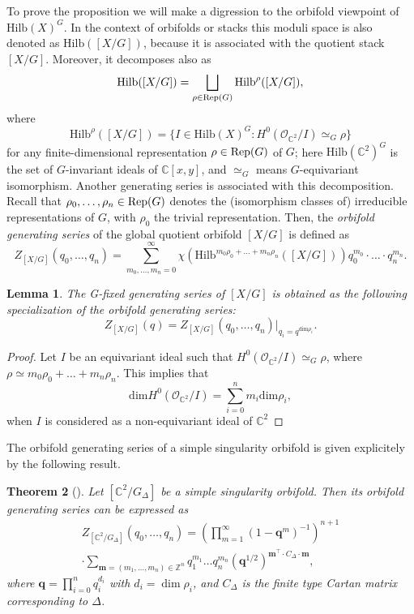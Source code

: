 \documentclass[11pt,a4paper]{amsart}
\newtheorem{theorem}{Theorem}[section]
\newtheorem{lemma}[theorem]{Lemma}
\theoremstyle{definition}
\newcommand{\SZ}{\mathbb{Z}}                    %
\newcommand{\SC}{\mathbb{C}}                    %
\begin{document}
To prove the proposition we will make a digression to the orbifold viewpoint of $\mathrm{Hilb}(X)^G$. In the context of orbifolds or stacks this moduli space is also denoted as $\mathrm{Hilb}([X/G])$, because it is associated with the quotient stack $[X/G]$. Moreover, it decomposes also as
\[ \mathrm{Hilb}([X/G])=\bigsqcup_{\rho \in {\mathop{\rm Rep}}(G)}\mathrm{Hilb}^{\rho}([X/G]),\]
where
\[\mathrm{Hilb}^{\rho}([X/G])=  \{ I \in \mathrm{Hilb}(X)^G \colon H^0(\mathcal{O}_{\SC^2}/I) \simeq_G \rho \}\]
for any finite-dimensional representation $\rho\in {\mathop{\rm Rep}}(G)$ of $G$;
here $\mathrm{Hilb}(\SC^2)^G$ is the set of $G$-invariant ideals of $\SC[x,y]$, and $\simeq_G$ means $G$-equivariant isomorphism. 
Another generating series is associated with this decomposition. Recall that $\rho_0,\ldots,\rho_n\in\mathop{\rm Rep}(G)$ denotes the (isomorphism classes of) irreducible representations of $G$, with $\rho_0$ the trivial representation. Then, the \textit{orbifold generating series} of the global quotient orbifold $[X/G]$ is defined as
\[Z_{[X/G]}(q_0,\ldots, q_n)= \sum_{m_0,\dots,m_n=0}^\infty \chi\left(\mathrm{Hilb}^{m_0 \rho_0 + \ldots +m_n \rho_n}([X/G]) \right)   q_0^{m_0}\cdot \ldots \cdot q_n^{m_n}.\]
\begin{lemma} The G-fixed generating series of $[X/G]$ is obtained as the following specialization of the orbifold generating series:
 \[Z_{[X/G]}(q)=Z_{[X/G]}(q_0,\ldots, q_n)\Big|_{q_i=q^{\mathrm{dim} \rho_i}}.\]
\end{lemma}
\begin{proof}
Let $I$ be an equivariant ideal such that $H^0(\mathcal{O}_{\SC^2}/I) \simeq_G \rho$, where $\rho \simeq m_0 \rho_0 + \ldots +m_n \rho_n$. This implies that
\[\mathrm{dim} H^0(\mathcal{O}_{\SC^2}/I) = \sum_{i=0}^{n} m_i \mathrm{dim} \rho_i, \]
when $I$ is considered as a non-equivariant ideal of $\SC^2$
\end{proof}





The orbifold generating series of a simple singularity orbifold is given explicitely by the following result.
\begin{theorem}[\cite{nakajima2002geometric}]  
\label{thm:genfunct}
Let $[\SC^2/G_\Delta]$ be a simple singularity orbifold. Then its orbifold generating series can be expressed as
\begin{multline*} Z_{[\SC^2/G_\Delta]}(q_0,\dots,q_n)=\left(\prod_{m=1}^{\infty}(1-\mathbf{q}^m)^{-1}\right)^{n+1} \\
\cdot\sum_{ \mathbf{m}=(m_1,\dots,m_n) \in \SZ^n } q_1^{m_1}\dots q_n^{m_n}(\mathbf{q}^{1/2})^{\mathbf{m}^\top \cdot C_\Delta \cdot \mathbf{m}},\label{eq:orbi_main_formula}\end{multline*}
where $\mathbf{q}=\prod_{i=0}^n q_i^{d_i}$ with $d_i=\dim\rho_i$, 
and $C_\Delta$ is the finite type Cartan matrix corresponding to $\Delta$.
\end{theorem}
\end{document}
